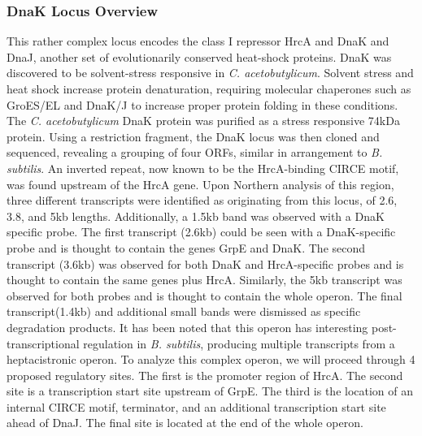 \subsubsection{DnaK Locus Overview}
This rather complex locus encodes the class I repressor HrcA and DnaK and DnaJ, another set of evolutionarily conserved heat-shock proteins. DnaK was discovered to be solvent-stress responsive in \textit{C. acetobutylicum}\cite{74,75}. Solvent stress and heat shock increase protein denaturation, requiring molecular chaperones such as GroES/EL and DnaK/J to increase proper protein folding in these conditions. The \textit{C. acetobutylicum} DnaK protein was purified as a stress responsive 74kDa protein\cite{75}. Using a restriction fragment, the DnaK locus was then cloned and sequenced\cite{80}, revealing a grouping of four ORFs, similar in arrangement to \textit{B. subtilis}\cite{77}. An inverted repeat, now known to be the HrcA-binding CIRCE motif, was found upstream of the HrcA gene\cite{80}. Upon Northern analysis of this region, three different transcripts were identified as originating from this locus, of 2.6, 3.8, and 5kb lengths. Additionally, a 1.5kb band was observed with a DnaK specific probe\cite{80}. The first transcript (2.6kb) could be seen with a DnaK-specific probe and is thought to contain the genes GrpE and DnaK. The second transcript (3.6kb) was observed for both DnaK and HrcA-specific probes and is thought to contain the same genes plus HrcA. Similarly, the 5kb transcript was observed for both probes and is thought to contain the whole operon. The final transcript(1.4kb) and additional small bands were dismissed as specific degradation products. It has been noted that this operon has interesting post-transcriptional regulation in \textit{B. subtilis}, producing multiple transcripts from a heptacistronic operon\cite{81}. To analyze this complex operon, we will proceed through 4 proposed regulatory sites. The first is the promoter region of HrcA. The second site is a transcription start site upstream of GrpE. The third is the location of an internal CIRCE motif, terminator, and an additional transcription start site ahead of DnaJ. The final site is located at the end of the whole operon.


